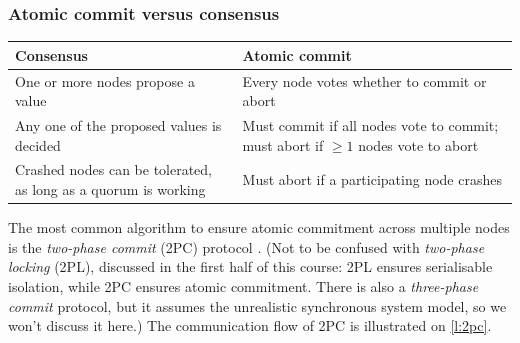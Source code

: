 \begin{frame}
    \label{s:atomic-commit-consensus}
    \frametitle{Atomic commit versus consensus}
    \renewcommand{\arraystretch}{1.5}
    \begin{tabular}{>{\raggedright}p{5cm}|>{\raggedright\arraybackslash}p{5cm}} %
        \textbf{Consensus} & \textbf{Atomic commit} \\\hline
        One or more nodes propose a value & Every node votes whether to commit or abort \pause\\
        Any one of the proposed values is decided & Must commit if all nodes vote to commit; must abort if $\ge 1$ nodes vote to abort \pause\\
        Crashed nodes can be tolerated, as long as a quorum is working & Must abort if a participating node crashes
    \end{tabular}
\end{frame}
\label{l:atomic-commit-consensus}

The most common algorithm to ensure atomic commitment across multiple nodes is the \emph{two-phase commit} (2PC) protocol \citep{Gray:1978}.
(Not to be confused with \emph{two-phase locking} (2PL), discussed in the first half of this course: 2PL ensures serialisable isolation, while 2PC ensures atomic commitment.
There is also a \emph{three-phase commit} protocol, but it assumes the unrealistic synchronous system model, so we won't discuss it here.)
The communication flow of 2PC is illustrated on \autoref{l:2pc}.

